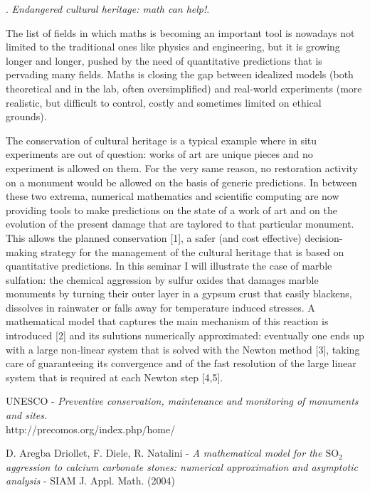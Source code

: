 \documentclass{article}
\def\noi{\noindent}
\begin{document}
\noi {\bf Matteo Semplice}.
{\it Endangered cultural heritage: math can help!}.

\noi The list of fields in which maths is becoming an important tool is nowadays not limited to the traditional ones like physics and engineering,  but it is growing longer and longer, pushed by the need of quantitative predictions 
that is pervading many fields. Maths is closing the gap between idealized models  (both theoretical and in the 
lab, often oversimplified) and real-world experiments 
(more realistic,  but difficult to control, costly and sometimes limited on ethical  grounds).

The conservation of cultural heritage is a typical example where in situ experiments are out of question: works of art are unique pieces and no experiment is allowed on them. For the very same reason, no restoration activity on a monument would be allowed on the basis of 
generic predictions. In between these two extrema, numerical mathematics and scientific computing are now providing tools to make predictions on the state of a work of art and on the evolution of the present damage 
that are taylored to that particular monument. 
This allows the planned conservation [1], a safer (and
cost effective) decision-making strategy for the management of the cultural heritage that is based on quantitative predictions.
In this seminar I will illustrate the case of marble sulfation: the chemical aggression  by sulfur oxides that damages marble monuments by turning their outer layer in a gypsum crust that easily blackens,  dissolves in rainwater or falls away for temperature induced stresses. 
A mathematical model that captures the main mechanism of this reaction is introduced [2]  and its sulutions numerically approximated: eventually one ends up with a large non-linear  system  that is solved with the Newton method [3], taking care of guaranteeing its  convergence  and of the fast resolution of the large linear system that  is required at each Newton step [4,5].
\vspace{10pt}

\noi [1] UNESCO - {\it Preventive conservation, maintenance and monitoring of monuments and sites}.  \\
http://precomos.org/index.php/home/

\noi [2] D. Aregba Driollet, F. Diele, R. Natalini - {\it A mathematical model for the $\mathrm{{SO}_2}$  aggression to calcium carbonate stones: numerical approximation and asymptotic analysis} - SIAM
 J. Appl. Math. (2004)
\end{document}
